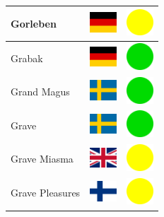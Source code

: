 \documentclass[12pt, a4paper, twoside]{report}
\begin{document}
\begin{center}
\begin{longtable}{|p{5cm}|p{2cm}|p{2cm}|}
 Gorleben                                                   & \includegraphics[width=1cm]{../4x3/de} &   \includegraphics[width=1cm]{../likes/m} \\ \hline
 Grabak                                                     & \includegraphics[width=1cm]{../4x3/de} &   \includegraphics[width=1cm]{../likes/y} \\ \hline
 Grand Magus                                                & \includegraphics[width=1cm]{../4x3/se} &   \includegraphics[width=1cm]{../likes/y} \\ \hline
 Grave                                                      & \includegraphics[width=1cm]{../4x3/se} &   \includegraphics[width=1cm]{../likes/y} \\ \hline
 Grave Miasma                                               & \includegraphics[width=1cm]{../4x3/gb} &   \includegraphics[width=1cm]{../likes/m} \\ \hline
 Grave Pleasures                                            & \includegraphics[width=1cm]{../4x3/fi} &   \includegraphics[width=1cm]{../likes/m} \\ \hline

\end{longtable}
\end{center}
\end{document}
